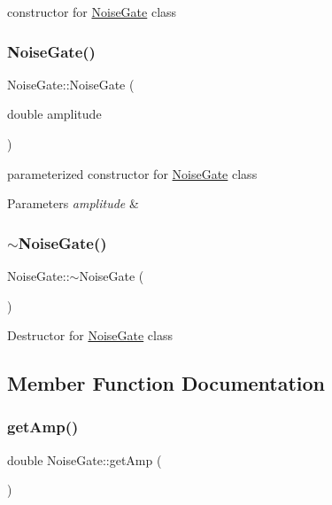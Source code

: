 constructor for \hyperlink{classNoiseGate}{Noise\+Gate} class \mbox{\label{classNoiseGate_a254a2b41b16d3e647067d03e76af18da}} 
\subsubsection{\texorpdfstring{Noise\+Gate()}{NoiseGate()}\hspace{0.1cm}{\footnotesize\ttfamily [2/2]}}
{\footnotesize\ttfamily Noise\+Gate\+::\+Noise\+Gate (\begin{DoxyParamCaption}\item[{double}]{amplitude }\end{DoxyParamCaption})}

parameterized constructor for \hyperlink{classNoiseGate}{Noise\+Gate} class 
\begin{DoxyParams}{Parameters}
{\em amplitude} & \\
\hline
\end{DoxyParams}
\mbox{\label{classNoiseGate_abcdf1888710c86086b1a595189191afd}} 
\subsubsection{\texorpdfstring{$\sim$\+Noise\+Gate()}{~NoiseGate()}}
{\footnotesize\ttfamily Noise\+Gate\+::$\sim$\+Noise\+Gate (\begin{DoxyParamCaption}{ }\end{DoxyParamCaption})\hspace{0.3cm}{\ttfamily [virtual]}}

Destructor for \hyperlink{classNoiseGate}{Noise\+Gate} class 

\subsection{Member Function Documentation}
\mbox{\label{classNoiseGate_aa3bc6ff59a5448071d8b78ece44190e7}} 
\subsubsection{\texorpdfstring{get\+Amp()}{getAmp()}}
{\footnotesize\ttfamily double Noise\+Gate\+::get\+Amp (\begin{DoxyParamCaption}{ }\end{DoxyParamCaption})}

